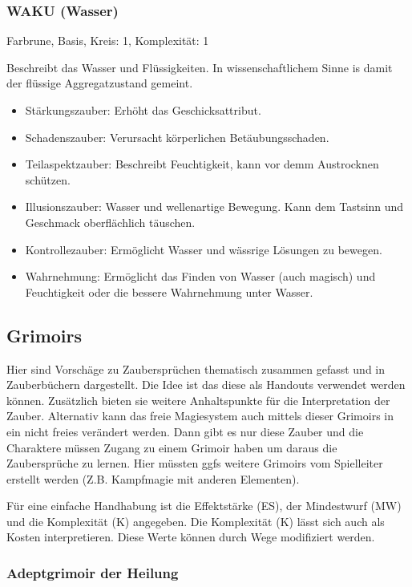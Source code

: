 \documentclass{article}
\begin{document}
\subsubsection{WAKU (Wasser)}

Farbrune, Basis, Kreis: 1, Komplexität: 1

Beschreibt das Wasser und Flüssigkeiten. In wissenschaftlichem Sinne is damit der flüssige Aggregatzustand gemeint.

\begin{itemize}
\item Stärkungszauber: Erhöht das Geschicksattribut.
\item Schadenszauber: Verursacht körperlichen Betäubungsschaden.
\item Teilaspektzauber: Beschreibt Feuchtigkeit, kann vor demm Austrocknen schützen.
\item Illusionszauber: Wasser und wellenartige Bewegung. Kann dem Tastsinn und Geschmack oberflächlich täuschen.
\item Kontrollezauber: Ermöglicht Wasser und wässrige Lösungen zu bewegen.
\item Wahrnehmung: Ermöglicht das Finden von Wasser (auch magisch) und Feuchtigkeit oder die bessere Wahrnehmung unter Wasser.
\end{itemize}

\begin{center}
\subsection{Grimoirs}
\end{center}

Hier sind Vorschäge zu Zaubersprüchen thematisch zusammen gefasst und in Zauberbüchern dargestellt. Die Idee ist das
diese als Handouts verwendet werden können. Zusätzlich bieten sie weitere Anhaltspunkte für die Interpretation der
Zauber. Alternativ kann das freie Magiesystem auch mittels dieser Grimoirs in ein nicht freies verändert werden.
Dann gibt es nur diese Zauber und die Charaktere müssen Zugang zu einem Grimoir haben um daraus die Zaubersprüche zu
lernen. Hier müssten ggfs weitere Grimoirs vom Spielleiter erstellt werden (Z.B. Kampfmagie mit anderen Elementen).

Für eine einfache Handhabung ist die Effektstärke (ES), der Mindestwurf (MW) und die Komplexität (K) angegeben. Die
Komplexität (K) lässt sich auch als Kosten interpretieren. Diese Werte können durch Wege modifiziert werden.

\subsubsection{Adeptgrimoir der Heilung}
\end{document}
